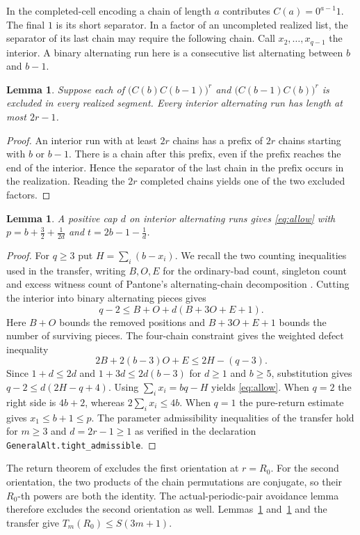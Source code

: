 \documentclass[11pt]{article}
\newtheorem{lemma}[theorem]{Lemma}
\newcommand{\code}[1]{\texttt{\small #1}}
\begin{document}
In the completed-cell encoding a chain of length $a$ contributes
$C(a)=0^{a-1}1$. The final $1$ is its short separator. In a factor of an
uncompleted realized list, the separator of its last chain may require the
following chain. Call $x_2,\ldots,x_{q-1}$ the interior. A binary alternating
run here is a consecutive list alternating between $b$ and $b-1$.
\begin{lemma}\label{lem:interior}
Suppose each of
$\big(C(b)C(b-1)\big)^r$ and $\big(C(b-1)C(b)\big)^r$
is excluded in every realized segment. Every interior alternating run has
length at most $2r-1$.
\end{lemma}
\begin{proof}
An interior run with at least $2r$ chains has a prefix of $2r$ chains
starting with $b$ or $b-1$. There is a chain after this prefix, even if the
prefix reaches the end of the interior. Hence the separator of the last
chain in the prefix occurs in the realization. Reading the $2r$ completed
chains yields one of the two excluded factors.
\end{proof}

\begin{lemma}\label{lem:allow}
A positive cap $d$ on interior alternating runs gives \eqref{eq:allow}
with $p=b+\frac32+\frac1{2d}$ and $t=2b-1-\frac1d$.
\end{lemma}
\begin{proof}
For $q\ge3$ put $H=\sum_i(b-x_i)$. We recall the two counting inequalities
used in the transfer, writing $B,O,E$ for the ordinary-bad count, singleton
count and excess witness count of Pantone's alternating-chain decomposition
\cite{pantone}. Cutting the interior into binary alternating pieces gives
\[
 q-2\le B+O+d(B+3O+E+1).
\]
Here $B+O$ bounds the removed positions and $B+3O+E+1$ bounds the number
of surviving pieces. The four-chain constraint gives the weighted defect
inequality
\[
 2B+2(b-3)O+E\le 2H-(q-3).
\]
Since $1+d\le2d$ and $1+3d\le2d(b-3)$ for $d\ge1$ and $b\ge5$,
substitution gives $q-2\le d(2H-q+4)$. Using
$\sum_i x_i=bq-H$ yields \eqref{eq:allow}. When $q=2$ the right side is
$4b+2$, whereas $2\sum_i x_i\le4b$. When $q=1$ the pure-return estimate
gives $x_1\le b+1\le p$. The parameter admissibility inequalities of the
transfer hold for $m\ge3$ and $d=2r-1\ge1$ as verified in
the declaration \code{GeneralAlt.tight\_admissible}.
\end{proof}

The return theorem of \cite{pantone} excludes the first orientation at
$r=R_0$. For the second orientation, the two products of the chain
permutations are conjugate, so their $R_0$-th powers are both the identity.
The actual-periodic-pair avoidance lemma therefore excludes the second
orientation as well. Lemmas~\ref{lem:interior} and~\ref{lem:allow} and the
transfer give $T_m(R_0)\le S(3m+1)$.
\end{document}

